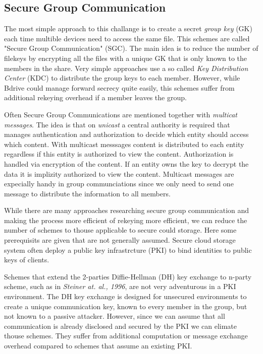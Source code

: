 \subsection{Secure Group Communication}
The most simple approach to this challange is to create a secret \textit{group key} (\ac{GK}) each time multible devices need to access the same file. This schemes are called "Secure Group Communication" (\ac{SGC}). The main idea is to reduce the number of filekeys by encrypting all the files with a unique \ac{GK} that is only known to the members in the share. Very simple approaches use a so called \textit{Key Distribution Center} (\ac{KDC}) to distribute the group keys to each member. However, while Bdrive could manage forward secrecy quite easily, this schemes suffer from additional rekeying overhead if a member leaves the group. 

Often Secure Group Communications are mentioned together with \textit{multicat messages}. The idea is that on \textit{unicast} a central authority is required that manages authentication and authorization to decide which entity should access which content. With multicast messsages content is distributed to each entity regardless if this entity is authorized to view the content. Authorization is handled via encryption of the content. If an entity owns the key to decrypt the data it is implizity authorized to view the content. Multicast messages are expecially handy in group communciations since we only need to send one message to distribute the information to all members. 

While there are many approaches researching secure group communication and making the process more efficient of rekeying more efficient, we can reduce the number of schemes to thouse applicable to secure could storage. Here some prerequisits are given that are not generally assumed. Secure cloud storage system often deploy a public key infrastrcture (\ac{PKI}) to bind identities to public keys of clients.

Schemes that extend the 2-parties Diffie-Hellman (\ac{DH}) key exchange to n-party scheme, such as in \textit{Steiner at. al., 1996}\cite{steiner1996diffie}, are not very adventurous in a \ac{PKI} environment. The \ac{DH} key exchange is designed for unsecured environments to create a unique communication key, known to every member in the group, but not known to a passive attacker. However, since we can assume that all communication is already disclosed and secured by the \ac{PKI} we can elimate thouse schemes. They suffer from additional computation or message exchange overhead compared to schemes that assume an existing \ac{PKI}.   

